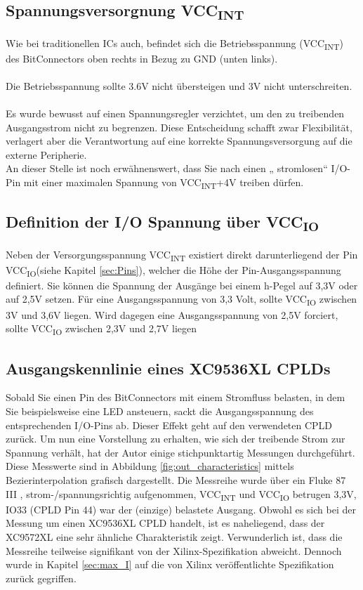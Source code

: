 \documentclass{article}
\begin{document}
\subsection{Spannungsversorgnung VCC\textsubscript{INT}}
Wie bei traditionellen ICs auch, befindet sich die Betriebsspannung (VCC\textsubscript{INT}) des BitConnectors oben rechts  in Bezug zu GND (unten links).
\\\\
Die Betriebsspannung sollte 3.6V nicht übersteigen und 3V nicht unterschreiten. \autocite[3]{XC95_Spec}
\\\\
Es wurde bewusst auf einen Spannungsregler verzichtet, um den zu treibenden Ausgangsstrom nicht zu begrenzen. Diese Entscheidung schafft zwar Flexibilität, verlagert aber die Verantwortung auf eine korrekte Spannungsversorgung auf die externe Peripherie.\\
An dieser Stelle ist noch erwähnenswert, dass Sie nach \autocite[17]{XC95_maxI} einen „ stromlosen“ I/O-Pin mit einer maximalen Spannung von VCC\textsubscript{INT}+4V treiben dürfen.

\subsection{Definition der I/O Spannung über VCC\textsubscript{IO}}

Neben der Versorgungsspannung VCC\textsubscript{INT} existiert direkt darunterliegend der Pin VCC\textsubscript{IO}(siehe Kapitel \ref{sec:Pins}), welcher die Höhe der Pin-Ausgangsspannung definiert. Sie können die Spannung der Ausgänge bei einem h-Pegel auf 3,3V oder auf 2,5V setzen. Für eine Ausgangsspannung von 3,3 Volt, sollte VCC\textsubscript{IO} zwischen 3V und 3,6V liegen. Wird dagegen eine Ausgangsspannung von 2,5V forciert, sollte VCC\textsubscript{IO} zwischen 2,3V und 2,7V liegen \autocite[3]{XC95_Spec}

\subsection{Ausgangskennlinie eines XC9536XL CPLDs}
Sobald Sie einen Pin des BitConnectors mit einem Stromfluss belasten, in dem Sie beispielsweise eine LED ansteuern, sackt die Ausgangsspannung des entsprechenden I/O-Pins ab. Dieser Effekt geht auf den verwendeten CPLD zurück. Um nun eine Vorstellung zu erhalten, wie sich der treibende Strom zur Spannung verhält, hat der Autor einige stichpunktartig Messungen durchgeführt. Diese Messwerte sind in Abbildung \ref{fig:out_characteristics} mittels Bezierinterpolation grafisch dargestellt.
Die Messreihe wurde über ein Fluke 87 III , strom-/spannungsrichtig aufgenommen, VCC\textsubscript{INT} und VCC\textsubscript{IO} betrugen 3,3V, IO33 (CPLD Pin 44) war der (einzige) belastete Ausgang. Obwohl es sich bei der Messung um einen XC9536XL CPLD handelt, ist es naheliegend, dass der XC9572XL eine sehr ähnliche Charakteristik zeigt. Verwunderlich ist, dass die Messreihe teilweise signifikant von der Xilinx-Spezifikation \autocite[6]{XC_Curves} abweicht.  Dennoch wurde in Kapitel \ref{sec:max_I} auf die von Xilinx veröffentlichte Spezifikation zurück gegriffen.
\end{document}

